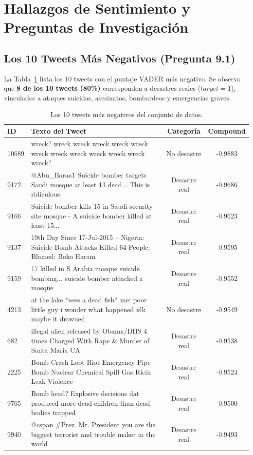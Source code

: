 \documentclass[11pt,a4paper]{article}
\begin{document}
\section{Hallazgos de Sentimiento y Preguntas de Investigación}

\subsection{Los 10 Tweets Más Negativos (Pregunta 9.1)}
La Tabla~\ref{tab:top10_neg} lista los 10 tweets con el puntaje VADER más negativo. Se observa que \textbf{8 de los 10 tweets (80\%)} corresponden a desastres reales ($target = 1$), vinculados a ataques suicidas, asesinatos, bombardeos y emergencias graves.

\begin{table}[H]
\centering
\scriptsize
\caption{Los 10 tweets más negativos del conjunto de datos.}
\label{tab:top10_neg}
\begin{tabularx}{\textwidth}{lp{9.8cm}cc}
\toprule
\textbf{ID} & \textbf{Texto del Tweet} & \textbf{Categoría} & \textbf{Compound} \\
\midrule
10689 & wreck? wreck wreck wreck wreck wreck wreck wreck wreck wreck wreck wreck wreck? & No desastre & -0.9883 \\
9172 & @Abu\_Baraa1 Suicide bomber targets Saudi mosque at least 13 dead... This is ridiculous & Desastre real & -0.9686 \\
9166 & Suicide bomber kills 15 in Saudi security site mosque - A suicide bomber killed at least 15... & Desastre real & -0.9623 \\
9137 & 19th Day Since 17-Jul-2015 -- Nigeria: Suicide Bomb Attacks Killed 64 People; Blamed: Boko Haram & Desastre real & -0.9595 \\
9159 & 17 killed in S Arabia mosque suicide bombing... suicide bomber attacked a mosque & Desastre real & -0.9552 \\
4213 & at the lake *sees a dead fish* me: poor little guy i wonder what happened idk maybe it drowned & No desastre & -0.9549 \\
682 & illegal alien released by Obama/DHS 4 times Charged With Rape \& Murder of Santa Maria CA & Desastre real & -0.9538 \\
2225 & Bomb Crash Loot Riot Emergency Pipe Bomb Nuclear Chemical Spill Gas Ricin Leak Violence & Desastre real & -0.9524 \\
9765 & Bomb head? Explosive decisions dat produced more dead children than dead bodies trapped & Desastre real & -0.9500 \\
9940 & @cspan \#Prez. Mr. President you are the biggest terrorist and trouble maker in the world & Desastre real & -0.9493 \\
\bottomrule
\end{tabularx}
\end{table}
\end{document}
